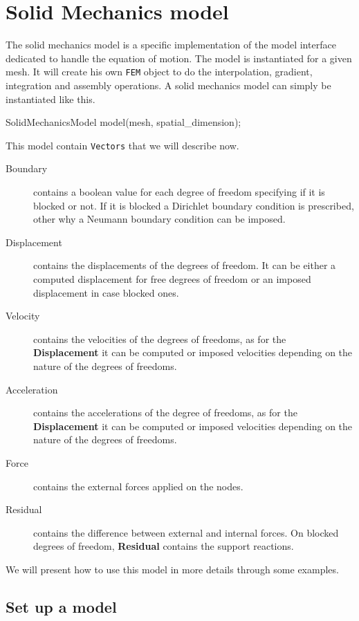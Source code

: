 \documentclass[a4paper,11pt]{book}
\newcommand{\code}[1]{{\tt{#1}}}
\begin{document}
\section{Solid Mechanics model}

The solid  mechanics model is a  specific implementation of  the model interface
dedicated to  handle the  equation of  motion. The model  is instantiated  for a
given mesh.  It will create his  own \code{FEM} object to  do the interpolation,
gradient,  integration and  assembly  operations. A  solid  mechanics model  can
simply be instantiated like this.
\begin{cpp}
SolidMechanicsModel model(mesh, spatial_dimension);
\end{cpp}

This model contain \code{Vectors} that we will describe now.
\begin{description}
\item[Boundary] contains a  boolean value for each degree  of freedom specifying
  if it is  blocked or not. If  it is blocked a Dirichlet  boundary condition is
  prescribed, other why a Neumann boundary condition can be imposed.
\item[Displacement] contains the displacements of the degrees of freedom. It can
  be either  a computed displacement  for free degrees  of freedom or  an imposed
  displacement in case blocked ones.
\item[Velocity] contains the  velocities of the degrees of  freedoms, as for the
  \textbf{Displacement} it  can be computed  or imposed velocities  depending on
  the nature of the degrees of freedoms.
\item[Acceleration] contains the accelerations of the degree of freedoms, as for
  the \textbf{Displacement}  it can be computed or  imposed velocities depending
  on the nature of the degrees of freedoms.
\item[Force] contains the external forces applied on the nodes.
\item[Residual] contains the difference  between external and internal forces. On
  blocked degrees of freedom, \textbf{Residual} contains the support reactions.
\end{description}

We will present how to use this model in more details through some examples.

\subsection{Set up a model}
\end{document}
